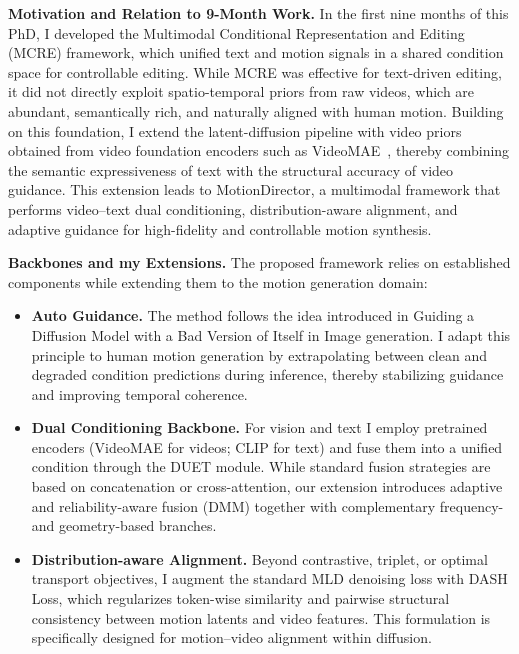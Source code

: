\documentclass[a4paper,12pt]{article}
\begin{document}
\textbf{Motivation and Relation to 9-Month Work.}
In the first nine months of this PhD, I developed the Multimodal Conditional Representation and Editing (MCRE) framework, which unified text and motion signals in a shared condition space for controllable editing. While MCRE was effective for text-driven editing, it did not directly exploit spatio-temporal priors from raw videos, which are abundant, semantically rich, and naturally aligned with human motion. Building on this foundation, I extend the latent-diffusion pipeline with video priors obtained from video foundation encoders such as VideoMAE~\cite{wang2023videomae}, thereby combining the semantic expressiveness of text with the structural accuracy of video guidance. This extension leads to MotionDirector, a multimodal framework that performs video–text dual conditioning, distribution-aware alignment, and adaptive guidance for high-fidelity and controllable motion synthesis.

\textbf{Backbones and my Extensions.}
The proposed framework relies on established components while extending them to the motion generation domain:
\begin{itemize}
    \item \textbf{Auto Guidance.} The method follows the idea introduced in Guiding a Diffusion Model with a Bad Version of Itself \cite{karras2024guiding} in Image generation. I adapt this principle to human motion generation by extrapolating between clean and degraded condition predictions during inference, thereby stabilizing guidance and improving temporal coherence.
    \item \textbf{Dual Conditioning Backbone.} For vision and text I employ pretrained encoders (VideoMAE for videos; CLIP for text) and fuse them into a unified condition through the DUET module. While standard fusion strategies are based on concatenation or cross-attention, our extension introduces adaptive and reliability-aware fusion (DMM) together with complementary frequency- and geometry-based branches.
    \item \textbf{Distribution-aware Alignment.} Beyond contrastive, triplet, or optimal transport objectives, I augment the standard MLD denoising loss with DASH Loss, which regularizes token-wise similarity and pairwise structural consistency between motion latents and video features. This formulation is specifically designed for motion–video alignment within diffusion.
\end{itemize}
\end{document}
